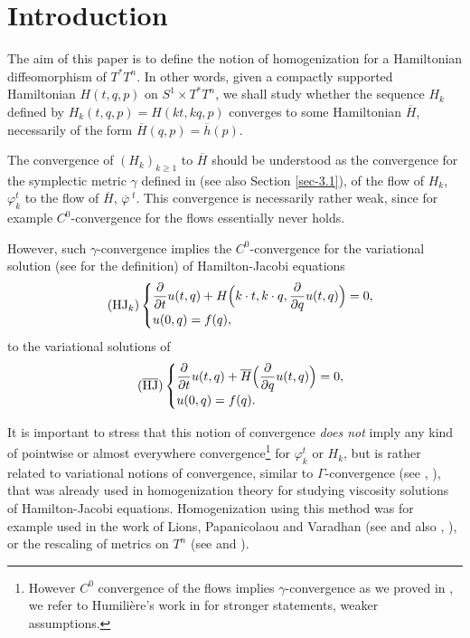 \documentclass[JEP,XML,SOM,NoFloatCountersInSection,Unicode,published]{cedram}
\newcommand{\HJ}{\mathrm{HJ}}
\numberwithin{equation}{section}
\theoremstyle{plain}
\theoremstyle{definition}
\theoremstyle{remark}
\begin{document}
\vspace*{-3\baselineskip}\mbox{}
\section{Introduction}
The aim of this paper is to define the notion of homogenization for a
Hamiltonian diffeomorphism of $T^{*}T^{n}$. In other words, given a compactly supported Hamiltonian
$H(t,q,p)$ on $S^{1}\times T^{*}T^{n}$, we shall study
whether the sequence $H_{k}$ defined by $H_{k}(t,q,p) = H(kt,kq,p)$ converges
to some Hamiltonian $\overline{H}$, necessarily of the form ${\overline H}(q,p)= {\overline h} (p)$.

The convergence of $(H_{k})_{k\geq 1}$ to $\overline H$ should be understood as the convergence for the symplectic metric $\gamma$ defined in \cite{Viterbo-STAGGF} (see also Section \ref{sec-3.1}), of
the flow of $H_{k}$, $\varphi^{t}_{k}$ to the flow
of $\overline{H}$, $\overline{\varphi}^{\;t}$.
This convergence is necessarily rather weak, since for example $C^{0}$-convergence for the flows essentially never holds.

However, such $\gamma$-convergence implies the $C^0$-convergence for the variational solution (see \cite{Viterbo-Ottolenghi} for the definition) of Hamilton-Jacobi equations
\begin{equation}
\tag{$\HJ_{k}$}
\begin{cases}
\dfrac{\partial}{\partial t} u (t,q) + H \Bigl(k\cdot t,k\cdot q, \dfrac{\partial}{\partial q}u (t,q)\Bigr) = 0,\\
u (0,q) = f(q),
\end{cases}
\end{equation}
to the variational solutions of
\begin{equation}
\tag{$\overline{\HJ}$}
\begin{cases}
\dfrac{\partial}{\partial t} u (t,q) + \overline H \Bigl(\dfrac{\partial}{\partial q}u (t,q)\Bigr) = 0,\\
u (0,q) = f(q).
\end{cases}
\end{equation}

It is important to stress that this notion of convergence \emph{does not} imply any kind of
pointwise or almost everywhere convergence\footnote{However $C^{0}$ convergence of the flows implies
$\gamma$-convergence as we proved in \cite{Viterbo-STAGGF}, we
refer to Humilière's work in \cite{Humiliere} for stronger statements, \ie weaker assumptions.} for $\varphi_k^t$ or $H_k$, but is rather
related to variational notions of convergence, similar to $\Gamma$-convergence
(see \cite{deGiorgi}, \cite{DalMaso}), that was already used in
homogenization theory for studying viscosity solutions of
Hamilton-Jacobi equations. Homogenization using this method was for example used in the work of Lions, Papanicolaou and Varadhan (see \cite{L-P-V} and also \cite{Evans}, \cite{Fathi1}), or the rescaling of metrics on $T^{n}$ (see \cite{Acerbi-Buttazzo} and \cite{Gromov}).
\end{document}
